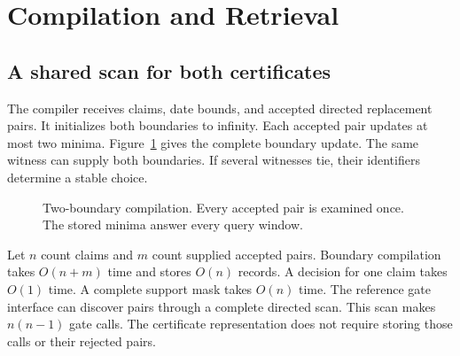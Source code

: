 \section{Compilation and Retrieval}
\label{sec:method}

\subsection{A shared scan for both certificates}

The compiler receives claims, date bounds, and accepted directed replacement pairs.
It initializes both boundaries to infinity.
Each accepted pair updates at most two minima.
Figure~\ref{fig:compiler} gives the complete boundary update.
The same witness can supply both boundaries.
If several witnesses tie, their identifiers determine a stable choice.

\begin{figure}[t]
\centering
{}
\caption{Two-boundary compilation. Every accepted pair is examined once. The stored minima answer every query window.}
\label{fig:compiler}
\end{figure}

Let $n$ count claims and $m$ count supplied accepted pairs.
Boundary compilation takes $O(n+m)$ time and stores $O(n)$ records.
A decision for one claim takes $O(1)$ time.
A complete support mask takes $O(n)$ time.
The reference gate interface can discover pairs through a complete directed scan.
This scan makes $n(n-1)$ gate calls.
The certificate representation does not require storing those calls or their rejected pairs.

